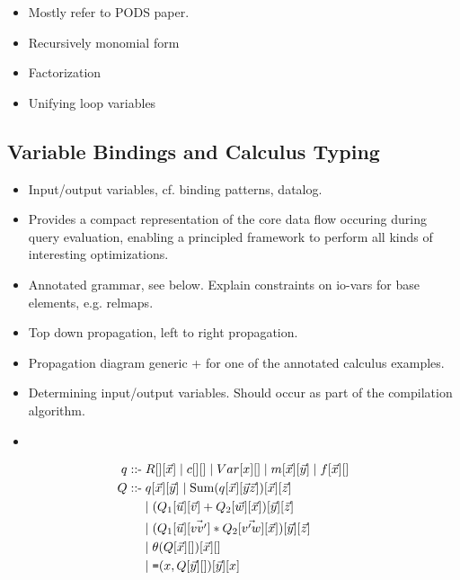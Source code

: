 
\begin{itemize}
  \item Mostly refer to PODS paper.
\end{itemize}

\begin{itemize}
  \item Recursively monomial form
  \item Factorization
  \item Unifying loop variables
\end{itemize}



\subsection{Variable Bindings and Calculus Typing}


\begin{itemize}
  \item Input/output variables, cf. binding patterns, datalog.
  \item Provides a compact representation of the core data flow occuring during
        query evaluation, enabling a principled framework to perform all kinds
        of interesting optimizations.
  \item Annotated grammar, see below. Explain constraints on io-vars for
        base elements, e.g. relmaps. 
  \item Top down propagation, left to right propagation.
  \item Propagation diagram generic + for one of the annotated calculus
        examples.
  \item Determining input/output variables. Should occur as part of the
       compilation algorithm. 
  \item {} 
\end{itemize}

\begin{align*} 
\q \; \mbox{::-} & \; R[][\vec{x}] \;|\; c[][] \;|\; Var[x][] \;|\;
m[\vec{x}][\vec{y}]\;|\; f[\vec{x}][]
\\
\comment{
& \;|\; \theta[x,y][] \;|\; \theta_c[x][] \;|\;
\calceq_\q[][y] \;|\; \calceq[x][y]
\\
}
\qq \; \mbox{::-} & \; \q[\vec{x}][\vec{y}] \;|\;
\calcsum(\q[\vec{x}][\vec{y}\vec{z}])[\vec{x}][\vec{z}] \\ & \;|\;
(\qqa[\vec{u}][\vec{v}] + \qqb[\vec{w}][\vec{x}])[\vec{y}][\vec{z}]
\\
& \;|\;
(\qqa[\vec{u}][\vec{vv'}] * \qqb[\vec{v'w}][\vec{x}])[\vec{y}][\vec{z}]
\\
& \;|\; \theta(\qq[\vec{x}][])[\vec{x}][] \\
& \;|\; \calceq(x,\qq[\vec{y}][])[\vec{y}][x]
\end{align*}

